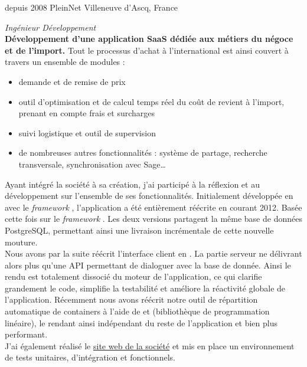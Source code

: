 \documentclass[]{cv} %
\begin{document}
\begin{entrylist}
\entry
{depuis 2008}
{PleinNet}
{Villeneuve d'Ascq, France}
{\emph{Ingénieur Développement}
\vspace{5pt}\\
\textbf{Développement d'une application SaaS dédiée aux métiers du négoce et de l'import.} Tout le processus d'achat à l'international est ainsi couvert à travers un ensemble de modules :
\begin{itemize}
\item demande et de remise de prix
\item outil d'optimisation et de calcul temps réel du coût de revient à l'import, prenant en compte frais et surcharges
\item suivi logistique et outil de supervision
\item de nombreuses autres fonctionnalités : système de partage, recherche transversale, synchronisation avec Sage…
\end{itemize}
\vspace{5pt}
Ayant intégré la société à sa création, j'ai participé à la réflexion et au développement sur l'ensemble de ses fonctionnalités. Initialement développée en  avec le \emph{framework} , l'application a été entièrement réécrite en  courant 2012. Basée cette fois sur le \emph{framework} . Les deux versions partagent la même base de données PostgreSQL, permettant ainsi une livraison incrémentale de cette nouvelle mouture.
\vspace{5pt}\\
Nous avons par la suite réécrit l'interface client en . La partie serveur ne délivrant alors plus qu'une API permettant de dialoguer avec la base de donnée. Ainsi le rendu est totalement dissocié du moteur de l'application, ce qui clarifie grandement le code, simplifie la testabilité et améliore la réactivité globale de l'application.
Récemment nous avons réécrit notre outil de répartition automatique de containers à l'aide de  et  (bibliothèque de programmation linéaire), le rendant ainsi indépendant du reste de l'application et bien plus performant.
\vspace{5pt}\\
J'ai également réalisé le \href{http://www.geniustrade.com}{site web de la société} et mis en place un environnement de tests unitaires, d'intégration et fonctionnels.
}
\entry

\end{entrylist}
\end{document}
